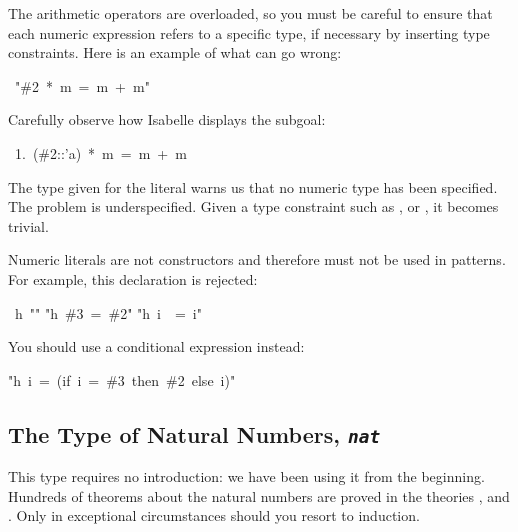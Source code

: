 \begin{warn}
The arithmetic operators are 
overloaded, so you must be careful to ensure that each numeric 
expression refers to a specific type, if necessary by inserting 
type constraints.  Here is an example of what can go wrong:
\par
\begin{isabelle}
\ "\#2\ *\ m\ =\ m\ +\ m"
\end{isabelle}
%
Carefully observe how Isabelle displays the subgoal:
\begin{isabelle}
\ 1.\ (\#2::'a)\ *\ m\ =\ m\ +\ m
\end{isabelle}
The type  given for the literal  warns us that no numeric
type has been specified.  The problem is underspecified.  Given a type
constraint such as ,  or , it becomes trivial.
\end{warn}

\begin{warn}
Numeric literals are not constructors and therefore must not be used in
patterns.  For example, this declaration is rejected:
\begin{isabelle}
\ h\ "\isacharbraceleft \isacharbraceright "\isanewline
"h\ \#3\ =\ \#2"\isanewline
"h\ i\ \ =\ i"
\end{isabelle}

You should use a conditional expression instead:
\begin{isabelle}
"h\ i\ =\ (if\ i\ =\ \#3\ then\ \#2\ else\ i)"
\end{isabelle}
\end{warn}



\subsection{The Type of Natural Numbers, {\tt\slshape nat}}

This type requires no introduction: we have been using it from the
beginning.  Hundreds of theorems about the natural numbers are
proved in the theories ,  and .  Only
in exceptional circumstances should you resort to induction.

